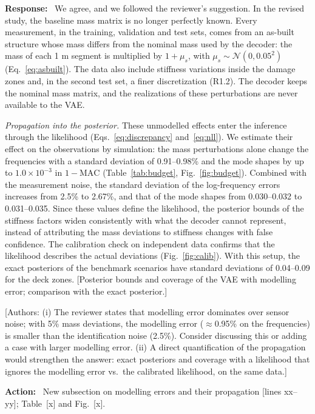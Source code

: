 \documentclass[11pt]{article}
\newenvironment{response}{\par\smallskip\noindent\color{resp}\textbf{Response:}\ }{\par}
\newenvironment{action}{\par\smallskip\noindent\color{resp}\textbf{Action:}\ }{\par}
\newcommand{\authornote}[1]{\textcolor{note}{\textsf{[Authors: #1]}}}
\newcommand{\tbd}[1]{\textcolor{note}{\textsf{[#1]}}}
\newcommand{\lines}[1]{\tbd{lines #1}}
\begin{document}
\begin{response}
We agree, and we followed the reviewer's suggestion. In the revised study, the baseline mass matrix is no longer
perfectly known. Every measurement, in the training, validation and test sets, comes from an as-built structure whose
mass differs from the nominal mass used by the decoder: the mass of each 1 m segment is multiplied by $1+\mu_s$, with
$\mu_s\sim\mathcal{N}(0,0.05^2)$ (Eq.~\eqref{eq:asbuilt}). The data also include stiffness variations inside the
damage zones and, in the second test set, a finer discretization (R1.2). The decoder keeps the nominal mass matrix, and
the realizations of these perturbations are never available to the VAE.

\textit{Propagation into the posterior.} These unmodelled effects enter the inference through the likelihood
(Eqs.~\eqref{eq:discrepancy} and~\eqref{eq:nll}). We estimate their effect on the observations by simulation: the mass
perturbations alone change the frequencies with a standard deviation of 0.91--0.98\% and the mode shapes by up to
$1.0\times10^{-3}$ in $1-\mathrm{MAC}$ (Table~\ref{tab:budget}, Fig.~\ref{fig:budget}). Combined with the measurement
noise, the standard deviation of the log-frequency errors increases from 2.5\% to 2.67\%, and that of the mode shapes
from 0.030--0.032 to 0.031--0.035. Since these values define the likelihood, the posterior bounds of the stiffness
factors widen consistently with what the decoder cannot represent, instead of attributing the mass deviations to
stiffness changes with false confidence. The calibration check on independent data confirms that the likelihood
describes the actual deviations (Fig.~\ref{fig:calib}). With this setup, the exact posteriors of the benchmark scenarios
have standard deviations of 0.04--0.09 for the deck zones.
\tbd{Posterior bounds and coverage of the VAE with modelling error; comparison with the exact posterior.}
\end{response}
\authornote{(i) The reviewer states that modelling error dominates over sensor noise; with 5\% mass deviations, the
modelling error ($\approx$0.95\% on the frequencies) is smaller than the identification noise (2.5\%). Consider
discussing this or adding a case with larger modelling error. (ii) A direct quantification of the propagation would
strengthen the answer: exact posteriors and coverage with a likelihood that ignores the modelling error vs.\ the
calibrated likelihood, on the same data.}

\begin{action}
New subsection on modelling errors and their propagation \lines{xx--yy}; Table~\tbd{x} and Fig.~\tbd{x}.
\end{action}
\end{document}
